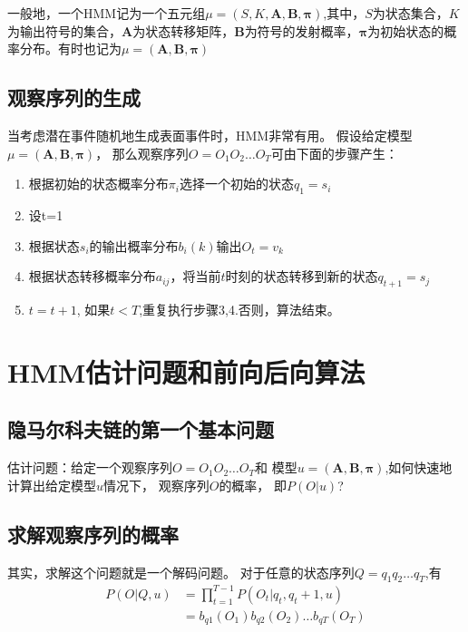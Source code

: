 \documentclass[a4paper,12pt]{book}
\begin{document}
    一般地，一个HMM记为一个五元组$ \mu =(S,K,\boldsymbol{A},\boldsymbol{B},\boldsymbol{\pi})$,其中，$S$为状态集合，$K$为输出符号的集合，$\boldsymbol{A}$为状态转移矩阵，$\boldsymbol{B}$为符号的发射概率，$\boldsymbol{\pi}$为初始状态的概率分布。有时也记为$ \mu =(\boldsymbol{A},\boldsymbol{B},\boldsymbol{\pi})$

    \subsection{观察序列的生成}
    当考虑潜在事件随机地生成表面事件时，HMM非常有用。
    假设给定模型$ \mu =(\boldsymbol{A},\boldsymbol{B},\boldsymbol{\pi})$，
    那么观察序列$O=O_1O_2\dots O_T$可由下面的步骤产生：
    \begin{enumerate}
        \item 根据初始的状态概率分布$\pi_i$选择一个初始的状态$q_1=s_i$
        \item 设t=1
        \item 根据状态$s_i$的输出概率分布$b_i(k)$输出$O_t=v_k$
        \item 根据状态转移概率分布$a_{ij}$，将当前$t$时刻的状态转移到新的状态$q_{t+1}=s_j$
        \item $t = t+1$, 如果$t<T$,重复执行步骤3,4.否则，算法结束。
    \end{enumerate}

    \section{HMM估计问题和前向后向算法}

    \subsection{隐马尔科夫链的第一个基本问题}
    估计问题：给定一个观察序列$O=O_1O_2\dots O_T$和
    模型$u = (\boldsymbol{A,B,\pi})$,如何快速地计算出给定模型$u$情况下，
    观察序列$O$的概率， 即$P(O|u)$?

    \subsection{求解观察序列的概率}
    其实，求解这个问题就是一个解码问题。
    对于任意的状态序列$Q=q_1q_2\dots q_T$,有
    \begin{equation}
        \begin{split}
            P(O|Q,u)&= \prod_{t=1}^{T-1} P(O_t|q_t,q_t+1,u) \\
            &=b_{q1}(O_1)b_{q2}(O_2)\dots b_{qT}(O_T)
        \end{split}
    \end{equation}
    
\end{document}
